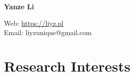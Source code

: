 \documentclass[12pt,letterpaper]{report}
\newcommand{\myname}{Yanze Li}
\newcommand{\namefont}[1]{{\normalfont\bfseries\Huge{#1}}}
\begin{document}
	\raggedright
	
		\namefont{\myname}

	\vspace{1em}
	\begin{minipage}[c]{0.7\textwidth}
		Web: \href{https://liyz.pl}{https://liyz.pl} \\		
		Email: liyzunique@gmail.com
	\end{minipage}
	\vspace{-0.5em}

	
	\section*{Research Interests}
	
\end{document}
